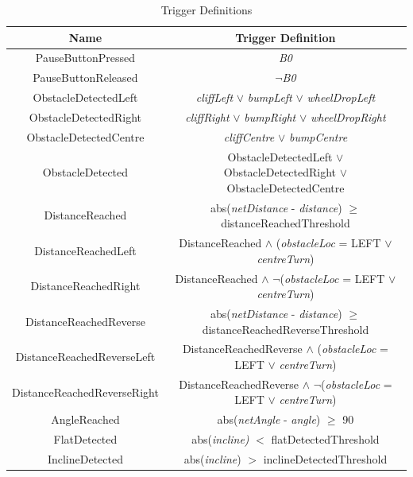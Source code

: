 \documentclass[11pt]{article}
\begin{document}
\begin{table}[p]
    \centering
    \begin{tabular}{|c|c|}
        \hline
        Name        & Trigger Definition \\
        \hline\hline
        PauseButtonPressed & \textit{B0} \\
        \hline
        PauseButtonReleased    & $\neg$\textit{B0}  \\
        \hline
        ObstacleDetectedLeft & \textit{cliffLeft} $\lor$ \textit{bumpLeft} $\lor$ \textit{wheelDropLeft}\\
        \hline
        ObstacleDetectedRight & \textit{cliffRight} $\lor$ \textit{bumpRight} $\lor$ \textit{wheelDropRight}\\
        \hline
        ObstacleDetectedCentre & \textit{cliffCentre} $\lor$ \textit{bumpCentre}\\
        \hline
        ObstacleDetected & ObstacleDetectedLeft $\lor$ ObstacleDetectedRight $\lor$ ObstacleDetectedCentre\\
        \hline
        DistanceReached & abs(\textit{netDistance} - \textit{distance}) $\geq$ distanceReachedThreshold\\
        \hline
        DistanceReachedLeft & DistanceReached $\land$ (\textit{obstacleLoc} = LEFT $\lor$ \textit{centreTurn})\\
        \hline
        DistanceReachedRight & DistanceReached $\land$ $\neg$(\textit{obstacleLoc} = LEFT $\lor$ \textit{centreTurn})\\
        \hline
        DistanceReachedReverse & abs(\textit{netDistance} - \textit{distance}) $\geq$ distanceReachedReverseThreshold\\
        \hline
        DistanceReachedReverseLeft & DistanceReachedReverse $\land$ (\textit{obstacleLoc} = LEFT $\lor$ \textit{centreTurn})\\
        \hline
        DistanceReachedReverseRight & DistanceReachedReverse $\land$ $\neg$(\textit{obstacleLoc} = LEFT $\lor$ \textit{centreTurn})\\
        \hline
        AngleReached & abs(\textit{netAngle} - \textit{angle}) $\geq$ 90\\
        \hline
        FlatDetected & abs(\textit{incline)} $<$ flatDetectedThreshold\\
        \hline
        InclineDetected & abs(\textit{incline}) $>$ inclineDetectedThreshold\\
        \hline
    \end{tabular}
    \caption{Trigger Definitions}
    \label{tab:triggers}
\end{table}
\end{document}
